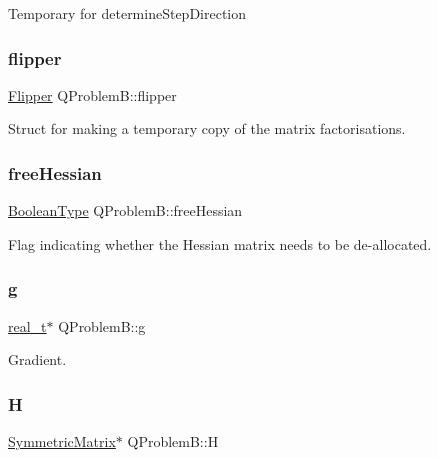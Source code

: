 Temporary for determine\+Step\+Direction \mbox{\label{class_q_problem_b_afc23c08b6cdc0ca93f9c049e9a318744}} 
\subsubsection{\texorpdfstring{flipper}{flipper}}
{\footnotesize\ttfamily \hyperlink{class_flipper}{Flipper} Q\+Problem\+B\+::flipper\hspace{0.3cm}{\ttfamily [protected]}}

Struct for making a temporary copy of the matrix factorisations. \mbox{\label{class_q_problem_b_a289ddec30e99470ebaa44aabd9f2ac7f}} 
\subsubsection{\texorpdfstring{free\+Hessian}{freeHessian}}
{\footnotesize\ttfamily \hyperlink{_types_8hpp_a20f82124c82b6f5686a7fce454ef9089}{Boolean\+Type} Q\+Problem\+B\+::free\+Hessian\hspace{0.3cm}{\ttfamily [protected]}}

Flag indicating whether the Hessian matrix needs to be de-\/allocated. \mbox{\label{class_q_problem_b_a3efcc81e7338d5d41c99e58a766315ba}} 
\subsubsection{\texorpdfstring{g}{g}}
{\footnotesize\ttfamily \hyperlink{qp_o_a_s_e_s__wrapper_8h_a0d00e2b3dfadee81331bbb39068570c4}{real\+\_\+t}$\ast$ Q\+Problem\+B\+::g\hspace{0.3cm}{\ttfamily [protected]}}

Gradient. \mbox{\label{class_q_problem_b_a10b5660ca133fee1cedbb9636cea8431}} 
\subsubsection{\texorpdfstring{H}{H}}
{\footnotesize\ttfamily \hyperlink{class_symmetric_matrix}{Symmetric\+Matrix}$\ast$ Q\+Problem\+B\+::H\hspace{0.3cm}{\ttfamily [protected]}}


